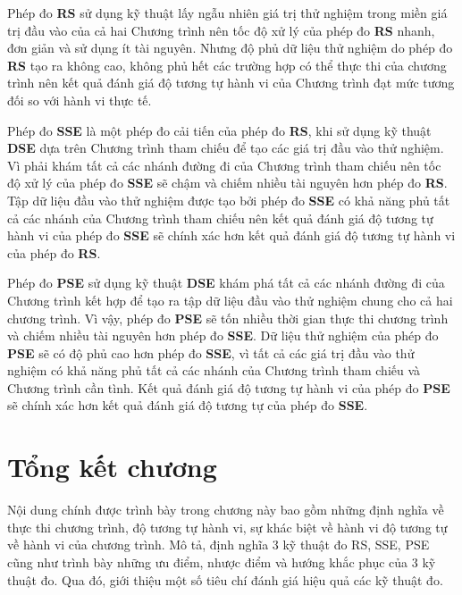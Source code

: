 Phép đo \textbf{RS} sử dụng kỹ thuật lấy ngẫu nhiên giá trị thử nghiệm trong miền giá trị đầu vào của cả hai Chương trình nên tốc độ xử lý của phép đo \textbf{RS} nhanh, đơn giản và sử dụng ít tài nguyên. Nhưng độ phủ dữ liệu thử nghiệm do phép đo \textbf{RS} tạo ra  không cao, không phủ hết các trường hợp có thể thực thi của chương trình nên kết quả đánh giá độ tương tự hành vi của Chương trình đạt mức tương đối so với hành vi thực tế.

Phép đo \textbf{SSE} là một phép đo cải tiến của phép đo \textbf{RS}, khi sử dụng kỹ thuật \textbf{DSE} dựa trên Chương trình tham chiếu để tạo các giá trị đầu vào thử nghiệm. Vì phải khám tất cả các nhánh đường đi của Chương trình tham chiếu nên tốc độ xử lý của phép đo \textbf{SSE} sẽ chậm và chiếm nhiều tài nguyên hơn phép đo \textbf{RS}. Tập dữ liệu đầu vào thử nghiệm được tạo bởi phép đo \textbf{SSE} có khả năng phủ tất cả các nhánh của Chương trình tham chiếu nên kết quả đánh giá độ tương tự hành vi của phép đo \textbf{SSE} sẽ chính xác hơn kết quả đánh giá độ tương tự hành vi của phép đo \textbf{RS}.

Phép đo \textbf{PSE} sử dụng kỹ thuật \textbf{DSE} khám phá tất cả các nhánh đường đi của Chương trình kết hợp để tạo ra tập dữ liệu đầu vào thử nghiệm chung cho cả hai chương trình. Vì vậy, phép đo \textbf{PSE} sẽ tốn nhiều thời gian thực thi chương trình và chiếm nhiều tài nguyên hơn phép đo \textbf{SSE}. Dữ liệu thử nghiệm của phép đo \textbf{PSE} sẽ có độ phủ cao hơn phép đo \textbf{SSE}, vì tất cả các giá trị đầu vào thử nghiệm có khả năng phủ tất cả các nhánh của Chương trình tham chiếu và Chương trình cần tình. Kết quả đánh giá độ tương tự hành vi của phép đo \textbf{PSE} sẽ chính xác hơn kết quả đánh giá độ tương tự của phép đo \textbf{SSE}.

\section*{Tổng kết chương}
Nội dung chính được trình bày trong chương này bao gồm những định nghĩa về thực thi chương trình, độ tương tự hành vi, sự khác biệt về hành vi độ tương tự về hành vi của chương trình. Mô tả, định nghĩa 3 kỹ thuật đo RS, SSE, PSE cũng như trình bày những ưu điểm, nhược điểm và hướng khắc phục của 3 kỹ thuật đo. Qua đó, giới thiệu một số tiêu chí đánh giá hiệu quả các kỹ thuật đo. 